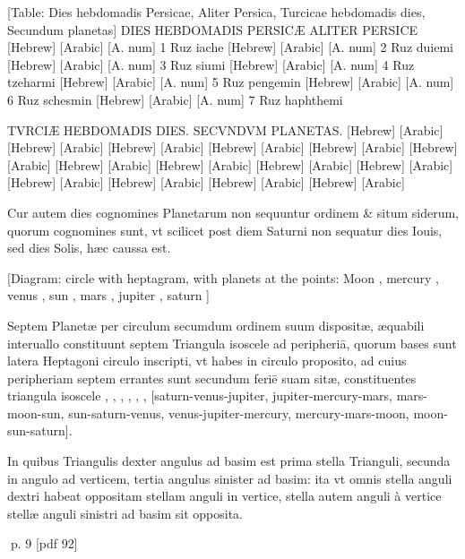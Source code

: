 \begin{parnumbers}

[Table: Dies hebdomadis Persicae, Aliter Persica, Turcicae hebdomadis dies, Secundum planetas]   
DIES HEBDOMADIS PERSICÆ
ALITER PERSICE
\texthebrew{[Hebrew]}
\textarabic{[Arabic]}
[A. num]
1
Ruz iache
\texthebrew{[Hebrew]}
\textarabic{[Arabic]}
[A. num]
2
Ruz duiemi
\texthebrew{[Hebrew]}
\textarabic{[Arabic]}
[A. num]
3
Ruz siumi
\texthebrew{[Hebrew]}
\textarabic{[Arabic]}
[A. num]
4
Ruz tzeharmi
\texthebrew{[Hebrew]}
\textarabic{[Arabic]}
[A. num]
5
Ruz pengemin
\texthebrew{[Hebrew]}
\textarabic{[Arabic]}
[A. num]
6
Ruz schesmin
\texthebrew{[Hebrew]}
\textarabic{[Arabic]}
[A. num]
7
Ruz haphthemi

TVRCIÆ HEBDOMADIS DIES.
SECVNDVM PLANETAS.
\texthebrew{[Hebrew]}
\textarabic{[Arabic]}
\texthebrew{[Hebrew]}
\textarabic{[Arabic]}
\texthebrew{[Hebrew]}
\textarabic{[Arabic]}
\texthebrew{[Hebrew]}
\textarabic{[Arabic]}
\texthebrew{[Hebrew]}
\textarabic{[Arabic]}
\texthebrew{[Hebrew]}
\textarabic{[Arabic]}
\texthebrew{[Hebrew]}
\textarabic{[Arabic]}
\texthebrew{[Hebrew]}
\textarabic{[Arabic]}
\texthebrew{[Hebrew]}
\textarabic{[Arabic]}
\texthebrew{[Hebrew]}
\textarabic{[Arabic]}
\texthebrew{[Hebrew]}
\textarabic{[Arabic]}
\texthebrew{[Hebrew]}
\textarabic{[Arabic]}
\texthebrew{[Hebrew]}
\textarabic{[Arabic]}
\texthebrew{[Hebrew]}
\textarabic{[Arabic]}

Cur autem dies cognomines Planetarum non sequuntur ordinem \& situm siderum, quorum cognomines sunt, vt scilicet post diem Saturni non sequatur dies Iouis, sed dies Solis, hæc caussa est.

[Diagram: circle with heptagram, with planets at the points: Moon , mercury , venus , sun , mars , jupiter , saturn ]

Septem Planetæ per circulum secumdum ordinem suum dispositæ, æquabili interuallo constituunt septem Triangula isoscele ad peripheriā,  quorum bases sunt latera Heptagoni circulo inscripti, vt habes in circulo proposito, ad cuius peripheriam septem errantes sunt secundum feriē suam sitæ, constituentes triangula isoscele , , , , , ,  [saturn-venus-jupiter, jupiter-mercury-mars, mars-moon-sun, sun-saturn-venus, venus-jupiter-mercury, mercury-mars-moon, moon-sun-saturn].

In quibus Triangulis dexter angulus ad basim est prima stella Trianguli, secunda in angulo ad verticem, tertia angulus sinister ad basim: ita vt omnis stella anguli dextri habeat oppositam stellam anguli in vertice, stella autem anguli à vertice stellæ anguli sinistri ad basim sit opposita.

\end{parnumbers}
\clearpage
p. 9 [pdf 92]

